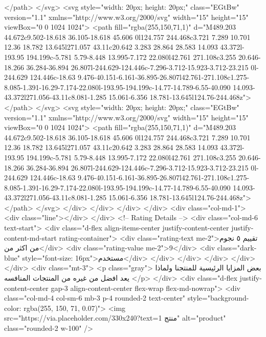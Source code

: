                         </path>
                      </svg>
                      <svg style="width: 20px; height: 20px;" class="EGtBw" version="1.1"
                        xmlns="http://www.w3.org/2000/svg" width="15" height="15" viewBox="0 0 1024 1024">
                        <path fill="rgba(255,150,71,1)"
                          d="M489.203 44.672c9.502-18.618 36.105-18.618 45.606 0l124.757 244.468c3.721 7.289 10.701 12.36 18.782 13.645l271.057 43.11c20.642 3.283 28.864 28.583 14.093 43.372l-193.95 194.199c-5.781 5.79-8.448 13.995-7.172 22.080l42.761 271.108c3.255 20.646-18.266 36.284-36.894 26.807l-244.629-124.446c-7.296-3.712-15.923-3.712-23.215 0l-244.629 124.446c-18.63 9.476-40.151-6.161-36.895-26.807l42.761-271.108c1.275-8.085-1.391-16.29-7.174-22.080l-193.95-194.199c-14.77-14.789-6.55-40.090 14.093-43.372l271.056-43.11c8.081-1.285 15.061-6.356 18.781-13.645l124.76-244.468z">
                        </path>
                      </svg>
                      <svg style="width: 20px; height: 20px;" class="EGtBw" version="1.1"
                        xmlns="http://www.w3.org/2000/svg" width="15" height="15" viewBox="0 0 1024 1024">
                        <path fill="rgba(255,150,71,1)"
                          d="M489.203 44.672c9.502-18.618 36.105-18.618 45.606 0l124.757 244.468c3.721 7.289 10.701 12.36 18.782 13.645l271.057 43.11c20.642 3.283 28.864 28.583 14.093 43.372l-193.95 194.199c-5.781 5.79-8.448 13.995-7.172 22.080l42.761 271.108c3.255 20.646-18.266 36.284-36.894 26.807l-244.629-124.446c-7.296-3.712-15.923-3.712-23.215 0l-244.629 124.446c-18.63 9.476-40.151-6.161-36.895-26.807l42.761-271.108c1.275-8.085-1.391-16.29-7.174-22.080l-193.95-194.199c-14.77-14.789-6.55-40.090 14.093-43.372l271.056-43.11c8.081-1.285 15.061-6.356 18.781-13.645l124.76-244.468z">
                        </path>
                      </svg>
                    </div>
                  </div>
                </div>
              </div>
              <div class="col-md-1">
                <div class="line"></div>
              </div>
              <!-- Rating Details -->
              <div class="col-md-6 text-start">
                <div
                  class="d-flex align-items-center justify-content-center justify-content-md-start rating-container">
                  <div class="rating-text me-2">تقييم ٥ نجوم من اكثر من</div>
                  <div class="rating-value me-2">9</div>
                  <div class="dark-blue" style="font-size: 16px">مستخدم</div>
                </div>
              </div>
            </div>
          </div>
        </div>
        <div class="mt-3">
          <p class="gray">
            بعض المزايا الرئيسية للمنتجنا ولماذا يعد افضل من غيره من المنتجات
            المنافسه
          </p>
        </div>
        <div class="d-flex justify-content-center gap-3 align-content-center flex-wrap flex-md-nowrap">
          <div class="col-md-4 col-sm-6 mb-3 p-4 rounded-2 text-center"
            style="background-color: rgba(255, 150, 71, 0.07)">
            <img src="https://via.placeholder.com/330x240?text=منتج 1" alt="product" class="rounded-2 w-100" />

